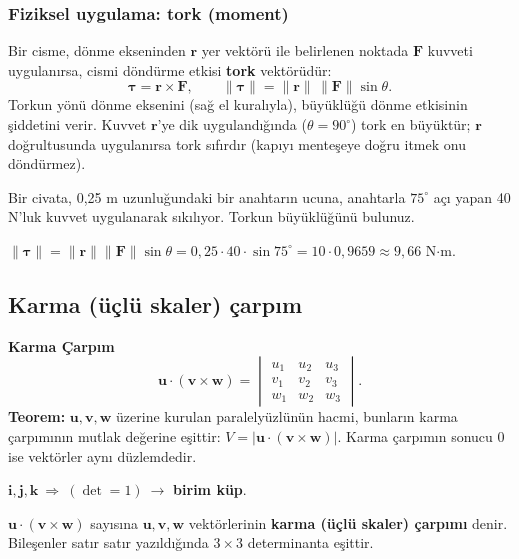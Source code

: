 \subsubsection{Fiziksel uygulama: tork (moment)}

Bir cisme, dönme ekseninden $\mathbf r$ yer vektörü ile belirlenen noktada $\mathbf F$ kuvveti uygulanırsa, cismi döndürme etkisi \textbf{tork} vektörüdür:
\[
\boldsymbol\tau=\mathbf r\times\mathbf F,\qquad \|\boldsymbol\tau\|=\|\mathbf r\|\,\|\mathbf F\|\sin\theta .
\]
Torkun yönü dönme eksenini (sağ el kuralıyla), büyüklüğü dönme etkisinin şiddetini verir. Kuvvet $\mathbf r$'ye dik uygulandığında ($\theta=90^\circ$) tork en büyüktür; $\mathbf r$ doğrultusunda uygulanırsa tork sıfırdır (kapıyı menteşeye doğru itmek onu döndürmez).

\begin{soru}
Bir civata, 0,25 m uzunluğundaki bir anahtarın ucuna, anahtarla $75^\circ$ açı yapan 40 N'luk kuvvet uygulanarak sıkılıyor. Torkun büyüklüğünü bulunuz.
\end{soru}
\begin{cevap}
$\|\boldsymbol\tau\|=\|\mathbf r\|\|\mathbf F\|\sin\theta=0{,}25\cdot40\cdot\sin75^\circ=10\cdot0{,}9659\approx9{,}66$ N$\cdot$m.
\end{cevap}

\subsection{Karma (üçlü skaler) çarpım}

\begin{tahta}
\textbf{Karma Çarpım}
\[
\mathbf u\cdot(\mathbf v\times\mathbf w)=\begin{vmatrix}u_1&u_2&u_3\\v_1&v_2&v_3\\w_1&w_2&w_3\end{vmatrix}.
\]
\textbf{Teorem:} $\mathbf u,\mathbf v,\mathbf w$ üzerine kurulan paralelyüzlünün hacmi, bunların karma çarpımının mutlak değerine eşittir: $V=|\mathbf u\cdot(\mathbf v\times\mathbf w)|$. Karma çarpımın sonucu $0$ ise vektörler aynı düzlemdedir.

$\mathbf i,\mathbf j,\mathbf k\ \Rightarrow\ (\det=1)\ \to$ \textbf{birim küp}.
\end{tahta}

\begin{tanim}
$\mathbf u\cdot(\mathbf v\times\mathbf w)$ sayısına $\mathbf u,\mathbf v,\mathbf w$ vektörlerinin \textbf{karma (üçlü skaler) çarpımı} denir. Bileşenler satır satır yazıldığında $3\times3$ determinanta eşittir.
\end{tanim}

